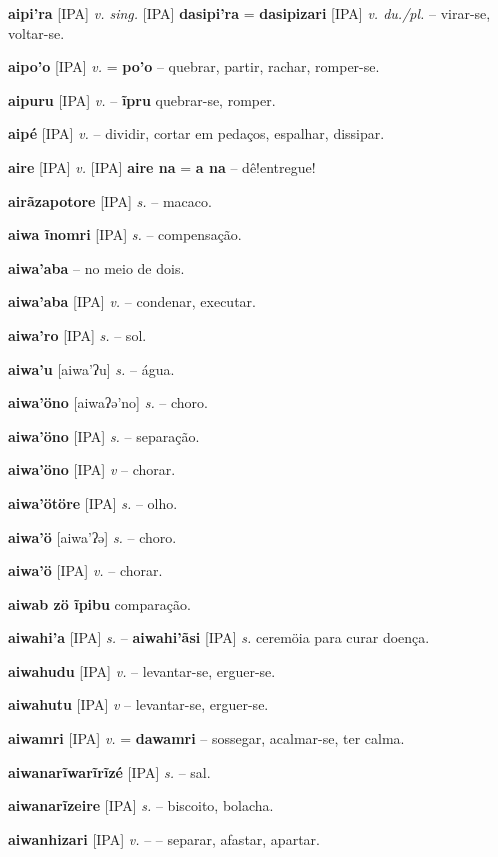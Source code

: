 \textbf{aipi'ra} [IPA] \textit{v. sing.} [IPA] \textbf{dasipi'ra} = \textbf{dasipizari} [IPA] \textit{v. du./pl.} -- virar-se, voltar-se.

\textbf{aipo'o} [IPA] \textit{v.} = \textbf{po'o} -- quebrar, partir, rachar, romper-se.

\textbf{aipuru} [IPA] \textit{v.} -- \textbf{ĩpru} quebrar-se, romper.

\textbf{aipé} [IPA] \textit{v.} -- dividir, cortar em pedaços, espalhar, dissipar.

\textbf{aire} [IPA] \textit{v.} [IPA] \textbf{aire na} = \textbf{a na} -- dê!entregue!

\textbf{airãzapotore} [IPA] \textit{s.} -- macaco.

\textbf{aiwa ĩnomri} [IPA] \textit{s.} -- compensação.

\textbf{aiwa'aba} -- no meio de dois.

\textbf{aiwa'aba} [IPA] \textit{v.} -- condenar, executar.

\textbf{aiwa'ro} [IPA] \textit{s.} -- sol.

\textbf{aiwa'u} [aiwa'ʔu] \textit{s.} -- água.

\textbf{aiwa'öno} [aiwaʔə'no] \textit{s.} -- choro.

\textbf{aiwa'öno} [IPA] \textit{s.} -- separação.

\textbf{aiwa'öno} [IPA] \textit{v} -- chorar.

\textbf{aiwa'ötöre} [IPA] \textit{s.} -- olho.

\textbf{aiwa'ö} [aiwa'ʔə] \textit{s.} -- choro.

\textbf{aiwa'ö} [IPA] \textit{v.} -- chorar.

\textbf{aiwab zö ĩpibu} comparação.

\textbf{aiwahi'a} [IPA] \textit{s.} -- \textbf{aiwahi'ãsi} [IPA] \textit{s.} ceremöia para curar doença.

\textbf{aiwahudu} [IPA] \textit{v.} -- levantar-se, erguer-se.

\textbf{aiwahutu} [IPA] \textit{v} -- levantar-se, erguer-se.

\textbf{aiwamri} [IPA] \textit{v.} = \textbf{dawamri} -- sossegar, acalmar-se, ter calma.

\textbf{aiwanarĩwarĩrĩzé} [IPA] \textit{s.} -- sal.

\textbf{aiwanarĩzeire} [IPA] \textit{s.} -- biscoito, bolacha.

\textbf{aiwanhizari} [IPA] \textit{v.} -- -- separar, afastar, apartar.

